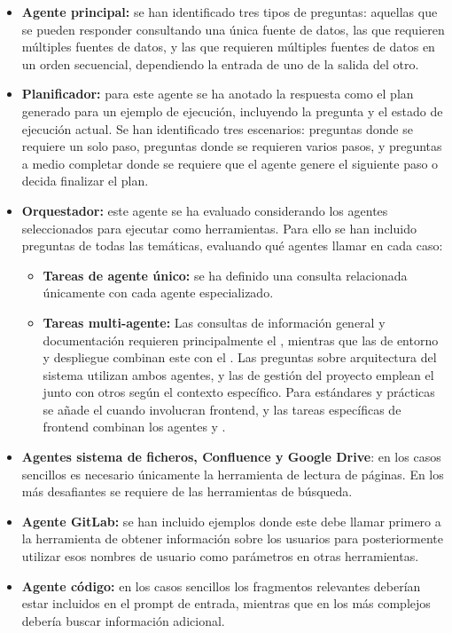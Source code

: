 \begin{itemize}
\item\textbf{Agente principal: }se han identificado tres tipos de preguntas: aquellas que se pueden responder consultando una única fuente de datos, las que requieren múltiples fuentes de datos, y las que requieren múltiples fuentes de datos en un orden secuencial, dependiendo la entrada de uno de la salida del otro.

\item\textbf{Planificador: }para este agente se ha anotado la respuesta como el plan generado para un ejemplo de ejecución, incluyendo la pregunta y el estado de ejecución actual. Se han identificado tres escenarios: preguntas donde se requiere un solo paso, preguntas donde se requieren varios pasos, y preguntas a medio completar donde se requiere que el agente genere el siguiente paso o decida finalizar el plan.

\item\textbf{Orquestador: }este agente se ha evaluado considerando los agentes seleccionados para ejecutar como herramientas. Para ello se han incluido preguntas de todas las temáticas, evaluando qué agentes llamar en cada caso:

\begin{itemize}
\item \textbf{Tareas de agente único: }se ha definido una consulta relacionada únicamente con cada agente especializado.

\item \textbf{Tareas multi-agente:} Las consultas de información general y documentación requieren principalmente el , mientras que las de entorno y despliegue combinan este con el . Las preguntas sobre arquitectura del sistema utilizan ambos agentes, y las de gestión del proyecto emplean el  junto con otros según el contexto específico. Para estándares y prácticas se añade el  cuando involucran frontend, y las tareas específicas de frontend combinan los agentes  y .

\end{itemize}
\item\textbf{Agentes sistema de ficheros, Confluence y Google Drive}: en los casos sencillos es necesario únicamente la herramienta de lectura de páginas. En los más desafiantes se requiere de las herramientas de búsqueda.
\item\textbf{Agente GitLab: }se han incluido ejemplos donde este debe llamar primero a la herramienta de obtener información sobre los usuarios para posteriormente utilizar esos nombres de usuario como parámetros en otras herramientas.
\item\textbf{Agente código: }en los casos sencillos los fragmentos relevantes deberían estar incluidos en el prompt de entrada, mientras que en los más complejos debería buscar información adicional.
\end{itemize}

